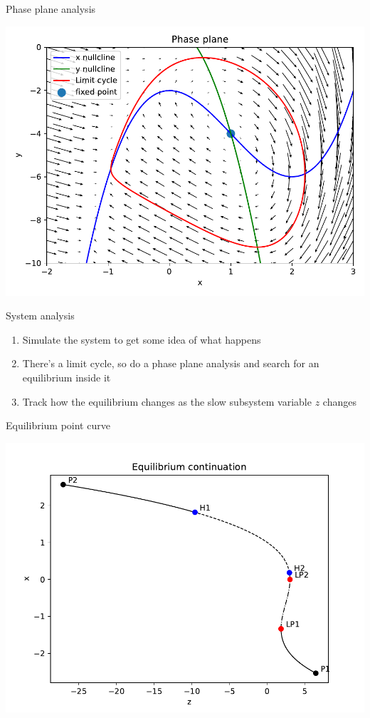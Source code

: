 \documentclass[presentation]{beamer}
\begin{document}
\begin{frame}[label={sec:org5211e33}]{Phase plane analysis}
\begin{center}
\includegraphics[height=.9\textheight]{./phaseplane.pdf}
\end{center}
\end{frame}

\begin{frame}[label={sec:org36175e3}]{System analysis}
\begin{enumerate}
\item Simulate the system to get some idea of what happens
\item There's a limit cycle, so do a phase plane analysis and search for an equilibrium inside it
\item Track how the equilibrium changes as the slow subsystem variable \(z\) changes
\end{enumerate}
\end{frame}

\begin{frame}[label={sec:orgf46e8ab}]{Equilibrium point curve}
\begin{center}
\includegraphics[height=.9\textheight]{./epc-1.pdf}
\end{center}
\end{frame}
\end{document}
